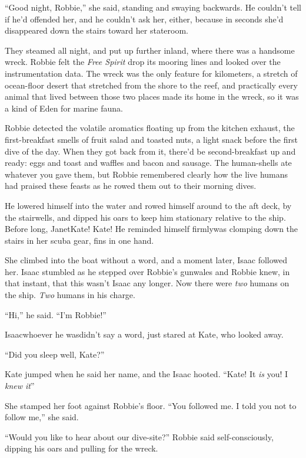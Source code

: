 “Good night, Robbie,” she said, standing and swaying backwards. He
couldn’t tell if he’d offended her, and he couldn’t ask her,
either, because in seconds she’d disappeared down the stairs toward
her stateroom.

\tb

They steamed all night, and put up further inland, where there was
a handsome wreck. Robbie felt the \emph{Free Spirit} drop its
mooring lines and looked over the instrumentation data. The wreck
was the only feature for kilometers, a stretch of ocean-floor
desert that stretched from the shore to the reef, and practically
every animal that lived between those two places made its home in
the wreck, so it was a kind of Eden for marine fauna.

Robbie detected the volatile aromatics floating up from the kitchen
exhaust, the first-breakfast smells of fruit salad and toasted
nuts, a light snack before the first dive of the day. When they got
back from it, there’d be second-breakfast up and ready: eggs and
toast and waffles and bacon and sausage. The human-shells ate
whatever you gave them, but Robbie remembered clearly how the live
humans had praised these feasts as he rowed them out to their
morning dives.

He lowered himself into the water and rowed himself around to the
aft deck, by the stairwells, and dipped his oars to keep him
stationary relative to the ship. Before long, Janet\dash{}Kate! Kate! He
reminded himself firmly\dash{}was clomping down the stairs in her scuba
gear, fins in one hand.

She climbed into the boat without a word, and a moment later, Isaac
followed her. Isaac stumbled as he stepped over Robbie’s gunwales
and Robbie knew, in that instant, that this wasn’t Isaac any
longer. Now there were \emph{two} humans on the ship. \emph{Two}
humans in his charge.

“Hi,” he said. “I’m Robbie!”

Isaac\dash{}whoever he was\dash{}didn’t say a word, just stared at Kate, who
looked away.

“Did you sleep well, Kate?”

Kate jumped when he said her name, and the Isaac hooted. “Kate! It
\emph{is} you! I \emph{knew it}”

She stamped her foot against Robbie’s floor. “You followed me. I
told you not to follow me,” she said.

“Would you like to hear about our dive-site?” Robbie said
self-consciously, dipping his oars and pulling for the wreck.

